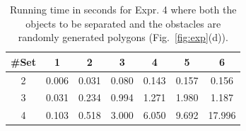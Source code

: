 \begin{table}[ht]
    \centering
    \begin{tabular}{|c|c|c|c|c|c|c|}\hline
         \#Set&  1 & 2 & 3 & 4& 5& 6\\\hline
2& 0.006 & 0.031 & 0.080 & 0.143 & 0.157 & 0.156 \\\hline
3& 0.031 & 0.234 & 0.994 & 1.271 & 1.980 & 1.187 \\\hline
4& 0.103 & 0.518 & 3.000 & 6.050 & 9.692 & 17.996 \\\hline 
    \end{tabular}
    \caption{Running time in seconds for Expr. 4 where both the objects to be separated and the obstacles are randomly generated polygons (Fig.~\ref{fig:exp}(d)).
    }
    \label{tab:expr_4}
    \vspace{-2mm}
\end{table}